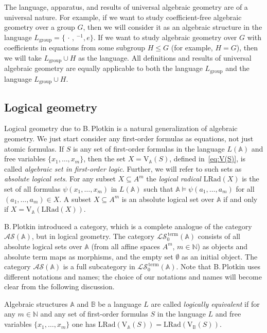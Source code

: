 \documentclass[12pt]{article}
\theoremstyle{definition}
\def\N{{\mathbb{N}}}
\def\MA{{\mathbb{A}}}
\def\MB{{\mathbb{B}}}
\def\LS{{\mathcal{LS}}}
\def\AS{{\mathcal{AS}}}
\def\term{{\,\mathrm{term}}}
\def\LRad{{\mathrm{LRad}}}
\def\V{{\mathrm{V}}}
\def\group{{\mathrm{group}}}
\begin{document}
The language, apparatus, and results of universal algebraic geometry are of a universal nature. For example, if we want to study coefficient-free algebraic geometry over a group $G$, then we will consider it as an algebraic structure in the language $L_\group=\{\,\cdot\,,\,^{-1},e\}$. If we want to study algebraic geometry over $G$ with coefficients in equations from some subgroup $H\leqslant G$ (for example, $H=G$), then we will take $L_\group\cup H$ as the language. All definitions and results of universal algebraic geometry are equally applicable to both the language $L_\group$ and the language $L_\group\cup H$.

\subsection{Logical geometry}\label{subsec:LG}

Logical geometry due to B.\,Plotkin is a natural generalization of algebraic geometry. We just start consider any first-order formulas as equations, not just atomic formulas. If $S$ is any set of first-order formulas in the language $L(\MA)$ and free variables $\{x_1,\ldots,x_m\}$, then the set $X=\V_\MA(S)$, defined  in~\eqref{eq:V(S)}, is called {\em algebraic set in first-order logic}. Further, we will refer to such sets as {\em absolute logical sets}. 
For any subset $X\subseteq A^m$ the {\em logical radical} $\LRad(X)$ is the set of all formulas $\psi(x_1,\ldots,x_m)$ in $L(\MA)$  such that $\MA\models\psi (a_1,\ldots,a_m)$ for all $(a_1,\ldots, a_m)\in X$. A subset $X\subseteq A^m$ is an absolute logical set over $\MA$ if and only if $X=\V_\MA(\LRad (X))$.

B.\,Plotkin introduced a category, which is a complete analogue of the category $\AS(\MA)$, but in logical geometry. The category $\LS_0^\term(\MA)$ consists of all absolute logical sets over $\MA$ (from all affine spaces $A^m$, $m\in \N$) as objects and absolute term maps as morphisms, and the empty set $\emptyset$ as an initial object. The category $\AS(\MA)$ is a full subcategory in $\LS^\term_0(\MA)$. Note that B.\,Plotkin uses different notations and names; the choice of our notations and names will become clear from the following discussion.

Algebraic structures $\MA$ and $\MB$ be a language $L$ are called {\em logically equivalent} if for any $m\in \N$ and any set of first-order formulas $S$ in the language $L$ and free variables $\{x_1,\ldots,x_m\}$ one has $\LRad(\V_\MA(S))=\LRad(\V_\MB(S))$.
\end{document}
